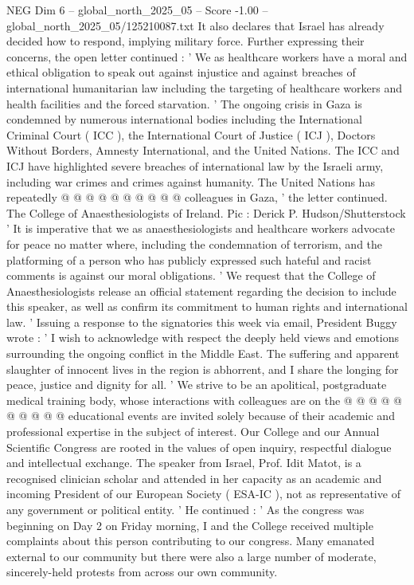 \begin{textsample}{NEG Dim 6 – global\_north\_2025\_05 – Score -1.00 – global\_north\_2025\_05/125210087.txt}
It also declares that Israel has already decided how to respond, implying military force.
Further expressing their concerns, the open letter continued : ' We as healthcare workers have a moral and ethical obligation to speak out against injustice and against breaches of international humanitarian law including the targeting of healthcare workers and health facilities and the forced starvation. ' The ongoing crisis in Gaza is condemned by numerous international bodies including the International Criminal Court ( ICC ), the International Court of Justice ( ICJ ), Doctors Without Borders, Amnesty International, and the United Nations.
The ICC and ICJ have highlighted severe breaches of international law by the Israeli army, including war crimes and crimes against humanity.
The United Nations has repeatedly @ @ @ @ @ @ @ @ @ @ colleagues in Gaza, ' the letter continued.
The College of Anaesthesiologists of Ireland.
Pic : Derick P.
Hudson/Shutterstock ' It is imperative that we as anaesthesiologists and healthcare workers advocate for peace no matter where, including the condemnation of terrorism, and the platforming of a person who has publicly expressed such hateful and racist comments is against our moral obligations. ' We request that the College of Anaesthesiologists release an official statement regarding the decision to include this speaker, as well as confirm its commitment to human rights and international law. ' Issuing a response to the signatories this week via email, President Buggy wrote : ' I wish to acknowledge with respect the deeply held views and emotions surrounding the ongoing conflict in the Middle East.
The suffering and apparent slaughter of innocent lives in the region is abhorrent, and I share the longing for peace, justice and dignity for all. ' We strive to be an apolitical, postgraduate medical training body, whose interactions with colleagues are on the @ @ @ @ @ @ @ @ @ @ educational events are invited solely because of their academic and professional expertise in the subject of interest.
Our College and our Annual Scientific Congress are rooted in the values of open inquiry, respectful dialogue and intellectual exchange.
The speaker from Israel, Prof.
Idit Matot, is a recognised clinician scholar and attended in her capacity as an academic and incoming President of our European Society ( ESA-IC ), not as representative of any government or political entity. ' He continued : ' As the congress was beginning on Day 2 on Friday morning, I and the College received multiple complaints about this person contributing to our congress.
Many emanated external to our community but there were also a large number of moderate, sincerely-held protests from across our own community.

\end{textsample}
